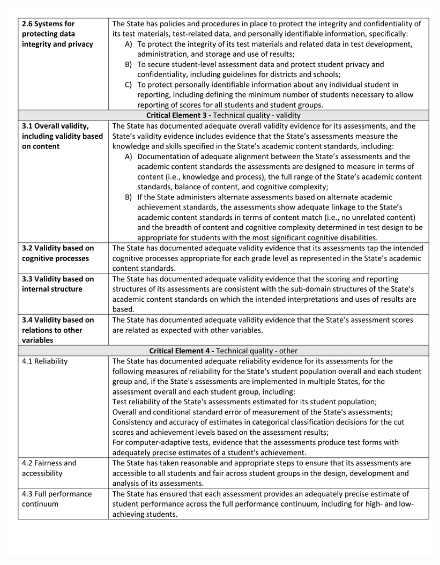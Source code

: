 \documentclass[]{article}
\begin{document}
\begin{figure}
\centering
\includegraphics{Figures/peer_rev/PeerReview3.pdf}
\caption{}
\end{figure}

\newpage
\end{document}
